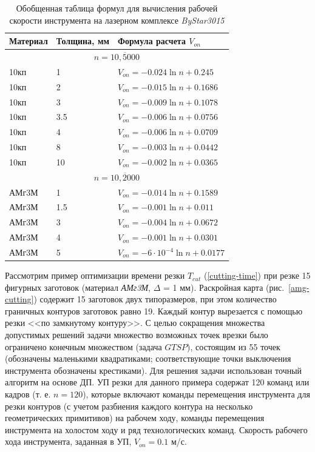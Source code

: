 \documentclass[11pt,twoside,openany]{report}
\begin{document}
\begin{table}
  \caption{
    Обобщенная таблица формул
    для вычисления рабочей скорости инструмента
    на лазерном комплексе
    {\it ByStar3015}
    }
  \label{v-formulae}
  \centering
  \begin{tabular}{l|l|l}
    \hline
    Материал & Толщина, мм & Формула расчета $V_{on}$ \\
    \hline
    \multicolumn{3}{c}{$n=\overline{10,5000}$} \\
    10кп & 1 & $V_{on} = -0.024 \ln n+0.245$ \\
    10кп & 2 & $V_{on} = -0.015 \ln n+0.1686$ \\
    10кп & 3 & $V_{on} = -0.009 \ln n+0.1078$ \\
    10кп & 3.5 & $V_{on} = -0.006 \ln n+0.0756$ \\
    10кп & 4 & $V_{on} = -0.006 \ln n+0.0709$ \\
    10кп & 8 & $V_{on} = -0.003 \ln n+0.0442$ \\
    10кп & 10 & $V_{on} = -0.002 \ln n+0.0365$ \\
    \multicolumn{3}{c}{$n=\overline{10,2000}$} \\
    АМг3М & 1 & $V_{on} = -0.014 \ln n+0.1589$ \\
    АМг3М & 1.5 & $V_{on} = -0.001 \ln n+0.011$ \\
    АМг3М & 3 & $V_{on} = -0.004 \ln n+0.0672$ \\
    АМг3М & 4 & $V_{on} = -0.001 \ln n+0.0301$ \\
    АМг3М & 5 & $V_{on} = -6\cdot 10^{-4} \ln n+0.0177$ \\
    \hline
  \end{tabular}
\end{table}

Рассмотрим пример оптимизации времени резки
$T_{cut}$
(\ref{cutting-time})
при резке 15 фигурных заготовок
(материал {\it АМг3М}, $\Delta$ = 1 мм).
Раскройная карта
(рис.~\ref{amg-cutting})
содержит 15 заготовок двух типоразмеров,
при этом количество граничных контуров заготовок равно 19.
Каждый контур вырезается с помощью резки
<<по замкнутому контуру>>.
С целью сокращения множества допустимых решений
задачи множество возможных точек врезки было
ограничено конечным множеством
(задача $GTSP$),
состоящим из 55 точек
(обозначены маленькими квадратиками;
соответствующие точки выключения инструмента обозначены крестиками).
Для решения задачи использован точный алгоритм на основе ДП.
УП резки для данного примера содержат 120 команд или кадров
(т. е. $n=120$),
которые включают команды перемещения инструмента
для резки контуров
(с учетом разбиения каждого контура на несколько геометрических примитивов)
на рабочем ходу,
команды перемещения инструмента на холостом ходу
и ряд технологических команд.
Скорость рабочего хода инструмента, заданная в УП,
$V_{on}=0.1$ м/с.
\end{document}
